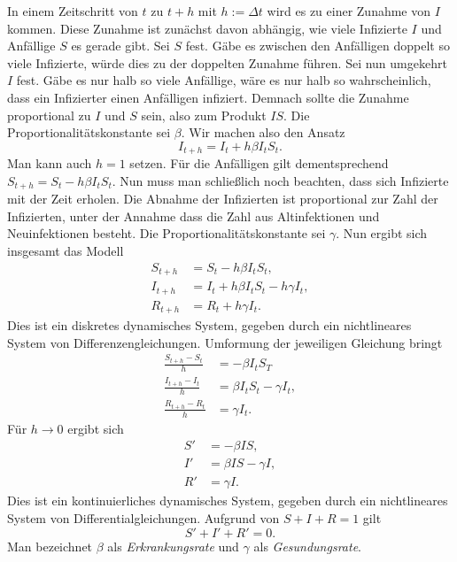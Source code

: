 \documentclass[a4paper,11pt,fleqn,twocolumn,twoside,dvipdfmx]{scrartcl}
\numberwithin{equation}{section}
\begin{document}
In einem Zeitschritt von $t$ zu $t+h$ mit $h:=\Delta t$ wird es zu
einer Zunahme von $I$ kommen. Diese Zunahme ist zunächst davon
abhängig, wie
viele Infizierte $I$ und Anfällige $S$ es gerade gibt. Sei
$S$ fest. Gäbe es zwischen den Anfälligen doppelt so viele Infizierte,
würde dies zu der doppelten Zunahme führen. Sei nun umgekehrt $I$
fest. Gäbe es nur halb so viele Anfällige, wäre es nur halb so
wahrscheinlich, dass ein Infizierter einen Anfälligen infiziert.
Demnach sollte die Zunahme proportional zu $I$ und $S$ sein, also
zum Produkt $IS$. Die Proportionalitätskonstante sei $\beta$. Wir machen
also den Ansatz%
\begin{equation}
I_{t+h} = I_t + h\beta I_t S_t.
\end{equation}
Man kann auch $h=1$ setzen. Für die Anfälligen gilt dementsprechend
$S_{t+h}=S_t-h\beta I_t S_t$. Nun muss man schließlich noch beachten,
dass sich Infizierte mit der Zeit erholen. Die Abnahme der Infizierten
ist proportional zur Zahl der Infizierten, unter der Annahme dass
die Zahl aus Altinfektionen und Neuinfektionen besteht. Die
Proportionalitätskonstante sei $\gamma$.
Nun ergibt sich insgesamt das Modell%
\begin{align}
S_{t+h} &= S_t-h\beta I_t S_t,\\
I_{t+h} &= I_t+h\beta I_t S_t-h\gamma I_t,\\
R_{t+h} &= R_t+h\gamma I_t.
\end{align}
Dies ist ein diskretes dynamisches System, gegeben durch ein
nichtlineares System von Differenzengleichungen. Umformung der jeweiligen
Gleichung bringt%
\begin{align}
\frac{S_{t+h}-S_t}{h} &= -\beta I_t S_T\\
\frac{I_{t+h}-I_t}{h} &= \beta I_t S_t-\gamma I_t,\\
\frac{R_{t+h}-R_t}{h} &= \gamma I_t.
\end{align}
Für $h\to 0$ ergibt sich
\begin{align}
\label{eq:SIR-System-S} S' &= -\beta IS,\\
\label{eq:SIR-System-I} I' &= \beta IS-\gamma I,\\
\label{eq:SIR-System-R} R' &= \gamma I.
\end{align}
Dies ist ein kontinuierliches dynamisches System, gegeben durch ein
nichtlineares System von Differentialgleichungen. Aufgrund von
$S+I+R=1$ gilt%
\begin{equation}
S'+I'+R'=0.
\end{equation}
Man bezeichnet $\beta$ als \emph{Erkrankungsrate} und
$\gamma$ als \emph{Gesundungsrate}.
\end{document}
